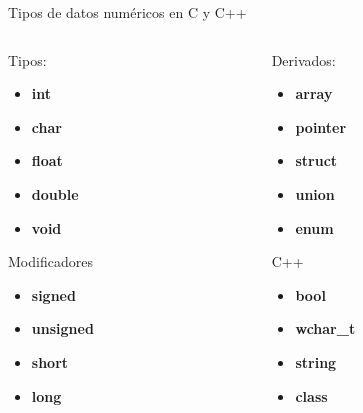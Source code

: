 \documentclass[aspectratio=169]{beamer}
\begin{document}
\begin{frame}[t]{Tipos de datos numéricos en C y C++}
\begin{columns}[c, onlytextwidth]
    \begin{column}{0.5\textwidth}
        Tipos: 
        \begin{itemize}
            \item \textbf{int}
            \item \textbf{char}
            \item \textbf{float}
            \item \textbf{double}
            \item \textbf{void}    
        \end{itemize}
        Modificadores
        \begin{itemize}
            \item \textbf{signed}
            \item \textbf{unsigned}
            \item \textbf{short}
            \item \textbf{long}  
        \end{itemize}
    \end{column}
    \begin{column}{0.5\textwidth}
        Derivados: 
        \begin{itemize}
            \item \textbf{array}
            \item \textbf{pointer}
            \item \textbf{struct}
            \item \textbf{union}
            \item \textbf{enum}    
        \end{itemize}
        C++
        \begin{itemize}
            \item \textbf{bool}
            \item \textbf{wchar\_t}
            \item \textbf{string}
            \item \textbf{class}  
        \end{itemize}
    \end{column}
\end{columns}

\end{frame}
\end{document}
